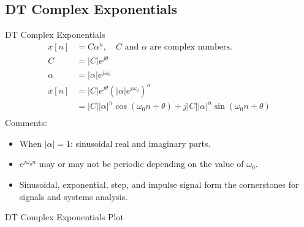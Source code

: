 \begin{frame}[plain]
    {
        {
            \centering
            
        }
    }
\end{frame}


\subsection{DT Complex Exponentials}
\begin{frame}[plain]{DT Complex Exponentials}
    \begin{align*}
        x[n] &= C\alpha^n, \quad C \text{ and } \alpha \text{ are complex numbers.}\\
        C &= |C|e^{j\theta}\\
        \alpha &= |\alpha|e^{j\omega_0}\\
        x[n] &= |C|e^{j\theta}\left(|\alpha|e^{j\omega_0}\right)^n\\
        &= |C||\alpha|^n\cos(\omega_0n + \theta) + j|C||\alpha|^n\sin(\omega_0n + \theta)\\
    \end{align*}
    Comments:
    \begin{itemize}
      \item When $|\alpha| = 1$: sinusoidal real and imaginary parts.
      \item $e^{j\omega_0 n}$ may or may not be periodic depending on the value of $\omega_0$.
      \item Sinusoidal, exponential, step, and impulse signal form the cornerstones for signals and systems analysis.
    \end{itemize}
\end{frame}





\begin{frame}[plain]{DT Complex Exponentials Plot}
    {
        {
            \centering
            
        }
    }
\end{frame}





